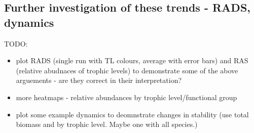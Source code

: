 \begin{itemize}
{}


\section{Further investigation of these trends - RADS, dynamics}

TODO:

\begin{itemize}
	\item plot RADS (single run with TL colours, average with error bars) and RAS (relative abudnaces of trophic levels) to demonstrate some of the above arguements - are they correct in their interpretation?
	
	\item more heatmaps - relative abundances by trophic level/functional group
	\item plot some example dynamics to deomnstrate changes in stability (use total biomass and by trophic level. Maybe one with all species.)
\end{itemize}


\end{itemize}
